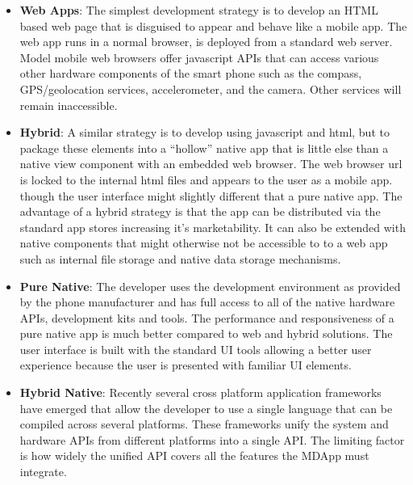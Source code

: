 \begin{itemize}[label={}]

\item \textbf{Web Apps}: The simplest development strategy is to develop an HTML based web page that is disguised to appear and behave like a mobile app. The web app runs in a normal browser, is deployed from a standard web server. Model mobile web browsers offer javascript APIs that can access various other hardware components of the smart phone such as the compass, GPS/geolocation services, accelerometer, and the camera. Other services will remain inaccessible.

\item \textbf{Hybrid}: A similar strategy is to develop using javascript and html, but to package these elements into a “hollow” native app that is little else than a native view component with an embedded web browser. The web browser url is locked to the internal html files and appears to the user as a mobile app. though the user interface might slightly different that a pure native app. The advantage of a hybrid strategy is that the app can be distributed via the standard app stores increasing it’s marketability. It can also be extended with native components that might otherwise not be accessible to to a web app such as internal file storage and native data storage mechanisms.

\item \textbf{Pure Native}: The developer uses the development environment as provided by the phone manufacturer and has full access to all of the native hardware APIs, development kits and tools. The performance and responsiveness of a pure native app is much better compared to web and hybrid solutions. The user interface is built with the standard UI tools allowing a better user experience because the user is presented with familiar UI elements.

\item \textbf{Hybrid Native}: Recently several cross platform application frameworks have emerged that allow the developer to use a single language that can be compiled across several platforms. These frameworks unify the system and hardware APIs from different platforms into a single API. The limiting factor is how widely the unified API covers all the features the MDApp must integrate.

\end{itemize}

